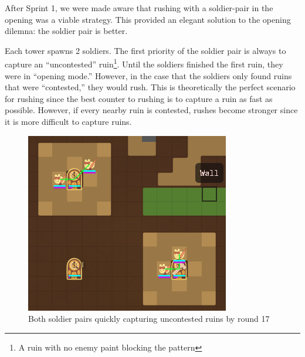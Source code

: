 \medskip

After Sprint 1, we were made aware that rushing with a soldier-pair in the opening was a viable strategy. This provided an elegant solution to the opening dilemna: the soldier pair is better.

\medskip

Each tower spawns 2 soldiers. The first priority of the soldier pair is always to capture an ``uncontested'' ruin\footnote{A ruin with no enemy paint blocking the pattern}. Until the soldiers finished the first ruin, they were in ``opening mode.'' However, in the case that the soldiers only found ruins that were ``contested,'' they would rush. This is theoretically the perfect scenario for rushing since the best counter to rushing is to capture a ruin as fast as possible. However, if every nearby ruin is contested, rushes become stronger since it is more difficult to capture ruins.
\begin{figure}[h]
  \centering
  \includegraphics[scale=0.75]{images/round_17_capture.png}
  \caption{Both soldier pairs quickly capturing uncontested ruins by round 17}
\end{figure}

